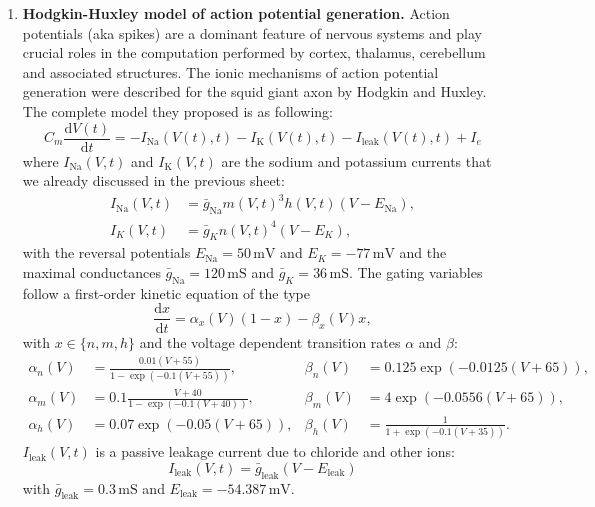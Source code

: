 \documentclass[12pt]{article}
\newcommand{\K}{\text{K}}
\newcommand{\Na}{\text{Na}}
\newcommand{\Leak}{\text{leak}}
\newcommand{\tderiv}[1]{\frac{\mathrm{d}#1}{\mathrm{d}t}}
\begin{document}
\begin{enumerate}

\item {\bf Hodgkin-Huxley model of action potential generation.}
Action potentials (aka spikes) are a dominant feature of nervous systems and
play crucial roles in the computation performed by cortex, thalamus,
cerebellum and associated structures.  The ionic mechanisms of action
potential generation were described for the squid giant axon by Hodgkin
and Huxley. The complete model they proposed is as following:
\begin{equation*}
    C_m \tderiv{V(t)}=-I_{\Na}(V(t), t) - I_{\K}(V(t), t) - I_{\Leak}(V(t),t)
+ I_e
    \label{eq:HHM}
\end{equation*}
where $I_{\Na}(V,t)$ and $I_{\K}(V,t)$ are the sodium and potassium currents
that we already discussed in the previous sheet:
\begin{align*}
    I_{\Na}(V,t) &= \bar{g}_{\Na}m(V,t)^3h(V,t)(V-E_{\Na}), \\
    I_K(V,t) &= \bar{g}_{K} n(V,t)^4 (V-E_K),
    \label{eq:potassium}
\end{align*}
with the reversal potentials $E_{\Na}=50\,\mathrm{mV}$ and
$E_K=-77\,\mathrm{mV}$ and the maximal conductances
$\bar{g}_{\Na}=120\,\mathrm{mS}$ and $\bar{g}_K=36\,\mathrm{mS}$. The gating
variables follow a first-order kinetic equation of the type
\begin{equation*}
    \tderiv{x}=\alpha_x(V)(1-x)-\beta_x(V)x,
    \label{eq:activation}
\end{equation*}
with $x \in \{n,m,h\}$ and the voltage dependent transition rates $\alpha$
and $\beta$:
\begin{align*}
        \alpha_n(V)&=\frac{0.01(V+55)}{1-\exp(-0.1(V+55))}, &
        \beta_n(V)&=0.125\exp(-0.0125(V+65)), \\
        \alpha_m(V)&=0.1\frac{V+40}{1-\exp(-0.1(V+40))}, &
        \beta_m(V)&=4\exp(-0.0556(V+65)), \\
        \alpha_h(V)&=0.07\exp(-0.05(V+65)), &
        \beta_h(V)&=\frac{1}{1+\exp(-0.1(V+35))}.
\end{align*}
$I_{\Leak}(V,t)$ is a passive leakage current due to chloride and other ions:
\begin{equation*}
I_{\Leak}(V,t)=\bar{g}_{\Leak}(V-E_{\Leak})
\end{equation*}
with $\bar{g}_{\Leak}=0.3\,\mathrm{mS}$ and
$E_{\Leak}=-54.387\,\mathrm{mV}$.


\end{enumerate}
\end{document}
